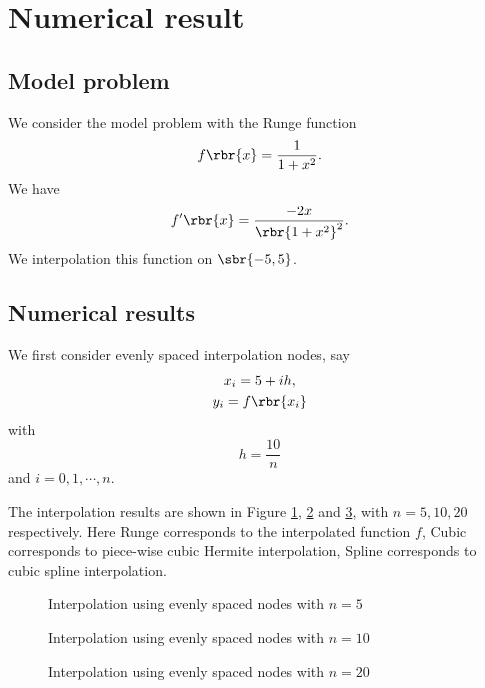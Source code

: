 \documentclass[english, nochinese]{pnote}
\begin{document}
\section{Numerical result}

\subsection{Model problem}

We consider the model problem with the Runge function
\begin{equation}
f \rbr{x} = \frac{1}{ 1 + x^2 }.
\end{equation}
We have
\begin{equation}
f' \rbr{x} = \frac{ -2 x }{\rbr{ 1 + x^2 }^2}.
\end{equation}
We interpolation this function on $ \sbr{ -5, 5 } $.

\subsection{Numerical results}

We first consider evenly spaced interpolation nodes, say
\begin{gather}
x_i = 5 + i h, \\
y_i = f \rbr{x_i}
\end{gather}
with
\begin{equation}
h = \frac{10}{n}
\end{equation}
and $ i = 0, 1, \cdots, n $.

The interpolation results are shown in Figure \ref{Fig:Even5}, \ref{Fig:Even10} and \ref{Fig:Even20}, with $ n = 5, 10, 20 $ respectively. Here \textsf{Runge} corresponds to the interpolated function $f$, \textsf{Cubic} corresponds to piece-wise cubic Hermite interpolation, \textsf{Spline} corresponds to cubic spline interpolation.

\begin{figure}
\centering
\scalebox{0.7}{}
\caption{Interpolation using evenly spaced nodes with $ n = 5 $}
\label{Fig:Even5}
\end{figure}

\begin{figure}
\centering
\scalebox{0.7}{}
\caption{Interpolation using evenly spaced nodes with $ n = 10 $}
\label{Fig:Even10}
\end{figure}

\begin{figure}
\centering
\scalebox{0.7}{}
\caption{Interpolation using evenly spaced nodes with $ n = 20 $}
\label{Fig:Even20}
\end{figure}
\end{document}
